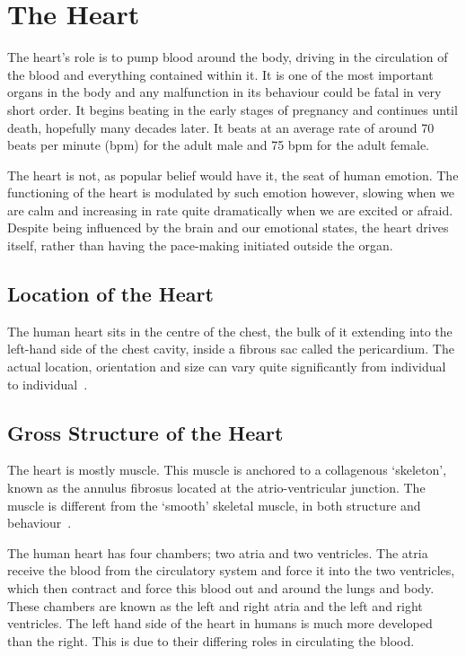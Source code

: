 \section{The Heart}

The heart's role is to pump blood around the body, driving in the circulation of
the blood and everything contained within it.  It is one of the most important
organs in the body and any malfunction in its behaviour could be fatal in very
short order.  It begins beating in the early stages of pregnancy and continues
until death, hopefully many decades later.  It beats at an average rate of
around 70 beats per minute (bpm) for the adult male and 75 bpm for the adult
female.

The heart is not, as popular belief would have it, the seat of human emotion.
The functioning of the heart is modulated by such emotion however, slowing when
we are calm and increasing in rate quite dramatically when we are excited or
afraid.  Despite being influenced by the brain and our emotional states, the
heart drives itself, rather than having the pace-making initiated outside the
organ.

\subsection{Location of the Heart}

The human heart sits in the centre of the chest, the bulk of it extending into the
left-hand side of the chest cavity, inside a fibrous sac called the pericardium.
The actual location, orientation and size can vary quite significantly from
individual to individual~\cite{Oberman1967}.


\subsection{Gross Structure of the Heart}

The heart is mostly muscle.
This muscle is anchored to a collagenous `skeleton', known as the annulus
fibrosus located at the atrio-ventricular junction.
The muscle is different from the `smooth' skeletal muscle, in both structure
and behaviour~\cite{Katz2006}.

The human heart has four chambers; two atria and two ventricles.  The atria receive
the blood from the circulatory system and force it into the two ventricles,
which then contract and force this blood out and around the lungs and body.
These chambers are known as the left and right atria and the left and right
ventricles.  The left hand side of the heart in humans is much more developed
than the right.
This is due to their differing roles in circulating the blood.

